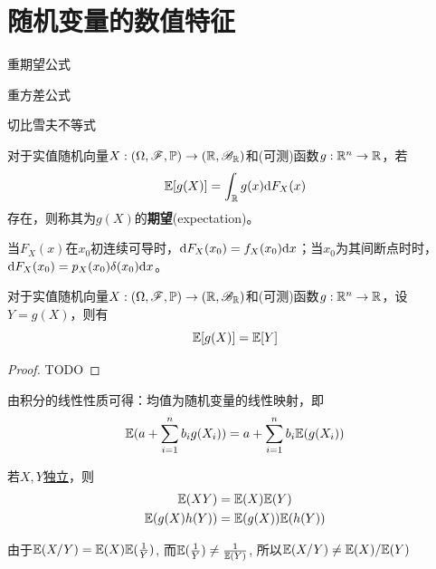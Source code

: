 \chapter{随机变量的数值特征}
\begin{introduction}[考试重点]
    \item 重期望公式
    \item 重方差公式
    \item 切比雪夫不等式
\end{introduction}

\begin{definition}[期望]
    对于实值随机向量$X :(\Omega,\mathscr{F},\mathbb{P}) \to(\mathbb{R},\mathscr{B}_{\mathbb{R}})$和(可测)函数$g : \mathbb{R}^n \to \mathbb{R}$，若
    \[ \mathbb{E}[g(X)] = \int_{\mathbb{R}} g(x) \mathrm{d} F_X(x) \]
    存在，则称其为$g(X)$的\textbf{期望}(expectation)。
\end{definition}

\begin{remark}
    当$F_X(x)$在$x_0$初连续可导时，$\mathrm{d} F_X(x_0)=f_X(x_0)\mathrm{d} x$；当$x_0$为其间断点时时，$\mathrm{d} F_X(x_0)=p_X(x_0)\delta(x_0)\mathrm{d} x$。
\end{remark}


\begin{theorem}
    对于实值随机向量$X :(\Omega,\mathscr{F},\mathbb{P}) \to(\mathbb{R},\mathscr{B}_{\mathbb{R}})$和(可测)函数$g : \mathbb{R}^n \to \mathbb{R}$，设 $Y=g(X)$，则有
    \[ \mathbb{E}[g(X)] = \mathbb{E}[Y] \]
\end{theorem}
\begin{proof}
    TODO
\end{proof}

\begin{proposition}[期望的线性性质]
    由积分的线性性质可得：均值为随机变量的线性映射，即
    \[ \mathbb{E}(a+\sum_{i=1}^n b_i g(X_i))=a+\sum_{i=1}^n b_i \mathbb{E}(g(X_i)) \]
\end{proposition}

\begin{proposition}[独立变量的期望]
    若$X,Y$\underline{独立}，则
    \begin{gather*}
        \mathbb{E}(XY)=\mathbb{E}(X)\mathbb{E}(Y) \\
        \mathbb{E}(g(X)h(Y))=\mathbb{E}(g(X))\mathbb{E}(h(Y))
    \end{gather*}
\end{proposition}

\begin{remark}
    由于$\mathbb{E}(X/Y)= \mathbb{E}(X)\mathbb{E}(\frac1{Y})$, 而$\mathbb{E}(\frac1{Y}) \neq \frac1{\mathbb{E}(Y)}$, 所以$\mathbb{E}(X/Y)\neq \mathbb{E}(X)/\mathbb{E}(Y)$
\end{remark}

